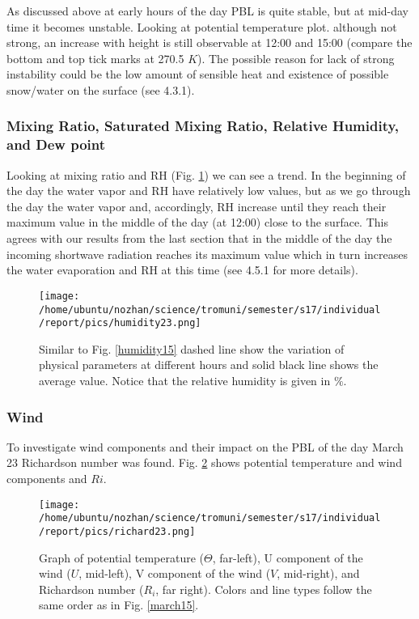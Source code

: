 \documentclass[a4paper,12pt]{article}
\numberwithin{equation}{section} %
\begin{document}
As discussed above at early hours of the day PBL is quite stable, but at mid-day time it becomes unstable. Looking at potential temperature plot. although not strong, an increase with height is still observable at 12:00 and 15:00 (compare the bottom and top tick marks at 270.5 $K$). The possible reason for lack of strong instability could be the low amount of sensible heat and existence of possible snow/water on the surface (see 4.3.1).

\subsubsection{Mixing Ratio, Saturated Mixing Ratio, Relative Humidity, and Dew point}

Looking at mixing ratio and RH (Fig. \ref{humidity23}) we can see a trend. In the beginning of the day the water vapor and RH have relatively low values, but as we go through the day the water vapor and, accordingly, RH increase until they reach their maximum value in the middle of the day (at 12:00) close to the surface. This agrees with our results from the last section that in the middle of the day the incoming shortwave radiation reaches its maximum value which in turn increases the water evaporation and RH at this time (see 4.5.1 for more details).

\begin{figure}[bhp]
\texttt{[image: /home/ubuntu/nozhan/science/tromuni/semester/s17/individual/report/pics/humidity23.png]}
\caption{Similar to Fig. \ref{humidity15} dashed line show the variation of physical parameters at different hours and solid black line shows the average value. Notice that the relative humidity is given in $\%$.}
\label{humidity23}
\end{figure}

\subsubsection{Wind}

To investigate wind components and their impact on the PBL of the day March 23 Richardson number was found. Fig. \ref{richard23} shows potential temperature and wind components and $Ri$. 

\begin{figure}[bhp]
\texttt{[image: /home/ubuntu/nozhan/science/tromuni/semester/s17/individual/report/pics/richard23.png]}
\caption{Graph of potential temperature ($\Theta$, far-left), U component of the wind ($U$, mid-left), V component of the wind ($V$, mid-right), and Richardson number ($R_i$, far right). Colors and line types follow the same order as in Fig. \ref{march15}.}
\label{richard23}
\end{figure}
\end{document}
